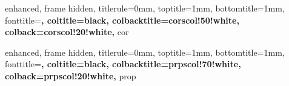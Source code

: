 

{
    enhanced,
    frame hidden,
    titlerule=0mm,
    toptitle=1mm,
    bottomtitle=1mm,
    fonttitle=\bfseries\large,
    coltitle=black,
    colbacktitle=corscol!50!white,
    colback=corscol!20!white,
}{cor}


\newenvironment{corpf}{
	{\noindent{\it \textbf{Proof.}}}
	\tcolorbox[blanker,breakable,left=5mm,parbox=false,
    before upper={\parindent15pt},
    after skip=10pt,
	borderline west={1mm}{0pt}{corscol!50!white}]
	\setlength{\parindent}{0pt}
}{
    \textcolor{corscol!50!white}{\hbox{}\nobreak\hfill$\blacksquare$} 
    \endtcolorbox
}

\NewDocumentCommand{\corp}{m+m+m}{
    \begin{corollary}{#1}{}
        #2
    \end{corollary}

    \begin{corpf}
        #3
    \end{corpf}
}


{
    enhanced,
    frame hidden,
    titlerule=0mm,
    toptitle=1mm,
    bottomtitle=1mm,
    fonttitle=\bfseries\large,
    coltitle=black,
    colbacktitle=prpscol!70!white,
    colback=prpscol!20!white,
}{prop}


\newenvironment{proppf}{
	{\noindent{\it \textbf{Proof.}}}
	\tcolorbox[blanker,breakable,left=5mm,parbox=false,
    before upper={\parindent15pt},
    after skip=10pt,
	borderline west={1mm}{0pt}{prpscol!50!white}]
	\setlength{\parindent}{0pt}
}{
    \textcolor{prpscol!50!white}{\hbox{}\nobreak\hfill$\blacksquare$} 
    \endtcolorbox
}



